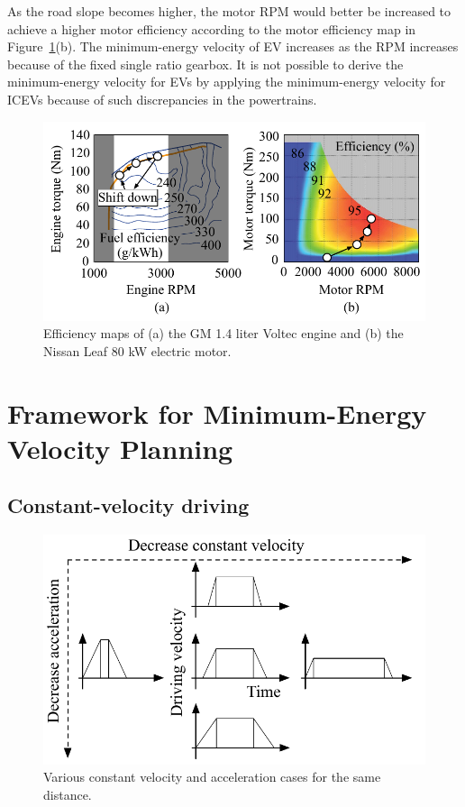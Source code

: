 \documentclass{IEEEtran}
\begin{document}
As the road slope becomes higher, the motor RPM would better be increased to achieve a higher motor efficiency according to the motor efficiency map in Figure~\ref{fig:efficiency_map}(b). The minimum-energy velocity of EV increases as the RPM increases because of the fixed single ratio gearbox. It is not possible to derive the minimum-energy velocity for EVs by applying  the minimum-energy velocity for ICEVs because of such discrepancies in the powertrains.

\begin{figure}	%
\includegraphics[width=1.0\hsize]{Figures/efficiency_maps.pdf}
\caption{Efficiency maps of (a) the GM 1.4 liter Voltec engine and (b) the Nissan Leaf 80 kW electric motor.}
\label{fig:efficiency_map}
\end{figure} 

\section{Framework for Minimum-Energy Velocity Planning} \label{sec:framework}

\subsection{Constant-velocity driving} \label{subsec:constant drive}

\begin{figure} %
\centering
\includegraphics[width=0.9\hsize]{Figures/const_vel_drive_problem.pdf}
\caption{Various constant velocity and acceleration cases for the same distance.}
\label{fig:const_vel_drive_problem}
\end{figure} 
\end{document}
